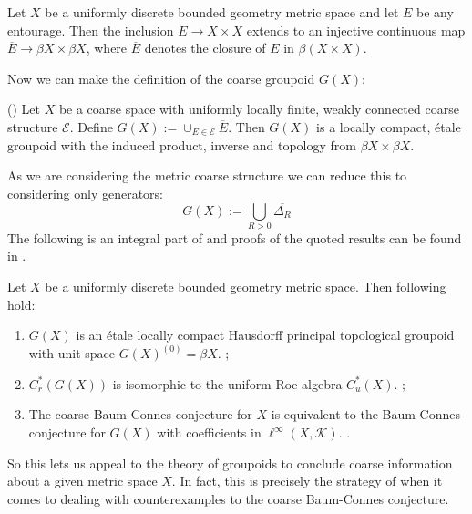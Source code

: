 \begin{lemma}\label{Lem:CorRoe}
Let $X$ be a uniformly discrete bounded geometry metric space and let $E$ be any entourage. Then the inclusion $E \rightarrow X \times X$ extends to an injective continuous map $\overline{E} \rightarrow \beta X \times \beta X$, where $\overline{E}$ denotes the closure of $E$ in $\beta(X \times X)$.
\end{lemma}
Now we can make the definition of the coarse groupoid $G(X)$:
\begin{theorem}(\cite[Theorem 10.20]{MR2007488})
Let $X$ be a coarse space with uniformly locally finite, weakly connected coarse structure $\mathcal{E}$. Define $G(X):=\cup_{E\in \mathcal{E}}\overline{E}.$ Then $G(X)$ is a locally compact, \'etale groupoid with the induced product, inverse and topology from $\beta X \times \beta X$.
\end{theorem}
As we are considering the metric coarse structure we can reduce this to considering only generators:
\begin{equation*}
G(X):=\bigcup_{R>0}\overline{\Delta_{R}}
\end{equation*}
The following is an integral part of \cite{MR1905840} and proofs of the quoted results can be found in \cite{MR2007488}.
\begin{theorem}
Let $X$ be a uniformly discrete bounded geometry metric space. Then following hold:
\begin{enumerate}
\item $G(X)$ is an \'etale locally compact Hausdorff principal topological groupoid with unit space $G(X)^{(0)}=\beta X$. \cite[Theorem 10.20]{MR2007488}\cite[Proposition 3.2]{MR1905840};
\item $C^{*}_{r}(G(X))$ is isomorphic to the uniform Roe algebra $C^{*}_{u}(X)$. \cite[Proposition 10.29]{MR2007488};
\item The coarse Baum-Connes conjecture for $X$ is equivalent to the Baum-Connes conjecture for $G(X)$ with coefficients in $\ell^{\infty}(X,\mathcal{K})$. \cite[Lemma 4.7]{MR1905840}.
\end{enumerate}
\end{theorem}

So this lets us appeal to the theory of groupoids to conclude coarse information about a given metric space $X$. In fact, this is precisely the strategy of \cite{MR1911663} when it comes to dealing with counterexamples to the coarse Baum-Connes conjecture.

